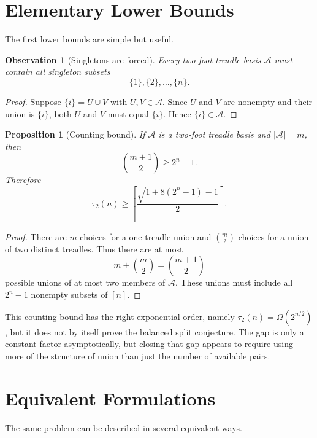 \documentclass[11pt]{article}
\newtheorem{proposition}{Proposition}
\newtheorem{observation}{Observation}
\newcommand{\A}{\mathcal{A}}
\begin{document}
\section{Elementary Lower Bounds}

The first lower bounds are simple but useful.

\begin{observation}[Singletons are forced]
  Every two-foot treadle basis \(\A\) must contain all singleton subsets
  \[
    \{1\},\{2\},\ldots,\{n\}.
  \]
\end{observation}

\begin{proof}
  Suppose \(\{i\}=U\cup V\) with \(U,V\in\A\). Since \(U\) and \(V\) are
  nonempty and their union is \(\{i\}\), both \(U\) and \(V\) must equal
  \(\{i\}\). Hence \(\{i\}\in\A\).
\end{proof}

\begin{proposition}[Counting bound]
  If \(\A\) is a two-foot treadle basis and \(|\A|=m\), then
  \[
    \binom{m+1}{2} \ge 2^n-1.
  \]
  Therefore
  \[
    \tau_2(n)
    \ge
    \left\lceil
      \frac{\sqrt{1+8(2^n-1)}-1}{2}
    \right\rceil.
  \]
\end{proposition}

\begin{proof}
  There are \(m\) choices for a one-treadle union and \(\binom{m}{2}\) choices
  for a union of two distinct treadles. Thus there are at most
  \[
    m+\binom{m}{2}=\binom{m+1}{2}
  \]
  possible unions of at most two members of \(\A\). These unions must include
  all \(2^n-1\) nonempty subsets of \([n]\).
\end{proof}

This counting bound has the right exponential order, namely
\(\tau_2(n)=\Omega(2^{n/2})\), but it does not by itself prove the balanced
split conjecture. The gap is only a constant factor asymptotically, but closing
that gap appears to require using more of the structure of union than just the
number of available pairs.

\section{Equivalent Formulations}

The same problem can be described in several equivalent ways.
\end{document}
